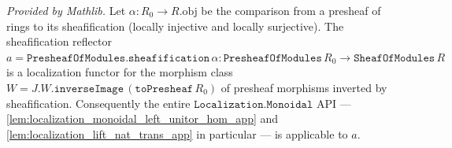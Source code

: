 \begin{lemma}
  \label{lem:presheaf_sheafification_is_localization}
  \mathlibok
  \textit{Provided by Mathlib.}
  Let \(\alpha : R_0 \to R.\mathrm{obj}\) be the comparison from a presheaf of rings to its
  sheafification (locally injective and locally surjective). The sheafification reflector
  \(a = \mathtt{PresheafOfModules.sheafification}\,\alpha : \mathtt{PresheafOfModules}\,R_0 \to
  \mathtt{SheafOfModules}\,R\) is a localization functor for the morphism class
  \(W = J.W.\mathtt{inverseImage}\,(\mathtt{toPresheaf}\,R_0)\) of presheaf morphisms inverted by
  sheafification. Consequently the entire \(\mathtt{Localization.Monoidal}\) API ---
  \cref{lem:localization_monoidal_left_unitor_hom_app} and
  \cref{lem:localization_lift_nat_trans_app} in particular --- is applicable to \(a\).
\end{lemma}

